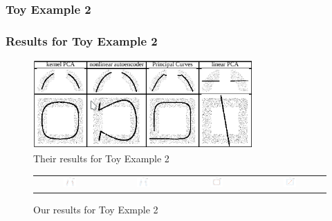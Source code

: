 \documentclass{beamer}
\begin{document}
\begin{frame}
    \frametitle{Toy Example 2}

\end{frame}

\begin{frame}
    \frametitle{Results for Toy Example 2}
    \begin{figure}
        \centering
        \includegraphics[width=0.75\textwidth]{images/paper-toy2}
        \caption*{Their results for Toy Example 2}
    \end{figure}
    \begin{figure}
        \centering
        \begin{tabular}{c c c c}
            \includegraphics[width=0.20\textwidth]{../code/fig/kpca_circle} &
            \includegraphics[width=0.20\textwidth]{../code/fig/pca_circle} &
            \includegraphics[width=0.20\textwidth]{../code/fig/kpca_box} &
            \includegraphics[width=0.20\textwidth]{../code/fig/pca_box} 
        \end{tabular}
        \caption*{Our results for Toy Exmple 2}
    \end{figure}
\end{frame}
\end{document}
